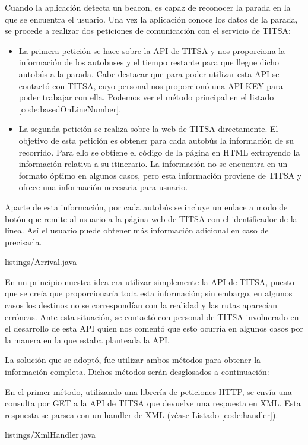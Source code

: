 Cuando la aplicación detecta un beacon, es capaz de reconocer la parada en la que se encuentra el usuario. Una vez la aplicación conoce los datos de la parada, se procede a realizar dos peticiones de comunicación con el servicio de TITSA: 


\begin{itemize}
\item La primera petición se hace sobre la API de TITSA y nos proporciona la información de los autobuses y el tiempo restante para que llegue dicho autobús a la parada. Cabe destacar que para poder utilizar esta API se contactó con TITSA, cuyo personal nos proporcionó una API KEY para poder trabajar con ella. Podemos ver el método principal en el listado \ref{code:basedOnLineNumber}.
\item La segunda petición se realiza sobre la web de TITSA directamente. El objetivo de esta petición es obtener para cada autobús la información de su recorrido. Para ello se obtiene el código de la página en HTML extrayendo la información relativa a su itinerario. La información no se encuentra en un formato óptimo en algunos casos, pero esta información proviene de TITSA y ofrece una información necesaria para usuario. 
\end{itemize}


Aparte de esta información, por cada autobús se incluye un enlace a modo de botón que remite al usuario a la página web de TITSA con el identificador de la línea. Así el usuario puede obtener más información adicional en caso de precisarla.


{listings/Arrival.java} %

En un principio nuestra idea era utilizar simplemente la API de TITSA, puesto que se creía que proporcionaría toda esta información; sin embargo, en algunos casos los destinos no se correspondían con la realidad y las rutas aparecían erróneas. Ante esta situación, se contactó con personal de  TITSA involucrado en el desarrollo de esta API quien nos comentó que esto ocurría en algunos casos por la manera en la que estaba planteada la API.


La solución que se adoptó, fue utilizar ambos métodos para obtener la información completa. Dichos métodos serán desglosados a continuación: 


En el primer método, utilizando una librería de peticiones HTTP, se envía una consulta por GET a la API de TITSA que devuelve una respuesta en XML. Esta respuesta se parsea con un handler de XML (véase Listado \ref{code:handler}). 
\vspace{5mm}

{listings/XmlHandler.java} %



